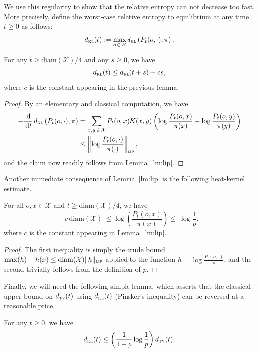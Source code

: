 \documentclass[AHL,Unicode,longabstracts,published]{cedram}
\newcommand{\dd}{\,\mathrm{d}}
\newcommand{\cX}{\mathcal{X}}
\newcommand{\dtv}{d_{\textsc{tv}}}
\newcommand{\dkl}{d_{\textsc{kl}}}
\newcommand{\pim}{p}
\newcommand{\diam}{\mathrm{diam}}
\newcommand{\lip}{{\textsc{lip}}}
\begin{document}
We use this regularity to show that the relative entropy can not decrease too fast. More precisely, define the worst-case relative entropy to equilibrium at any time $t\ge 0$ as follows:
\[
\dkl(t) := \max_{o\,\in\,\cX}\dkl\left(P_t(o,\cdot),\pi\right).
\]


\begin{lemm}\label{lm:slow}
For any $t\ge \diam(\cX)/4$ and any $s\ge 0$, we have
\[
\dkl(t) \le \dkl(t+s)+c s,
\]
where $c$ is the constant appearing in the previous lemma.
\end{lemm}

\begin{proof}
By an elementary and classical computation, we have
\begin{align*}
-\frac{\dd}{\dd t}\,\dkl\left(P_t(o,\cdot),\pi\right) & = \sum_{x,y\,\in\,\cX}P_t(o,x)K(x,y)\left(\log\frac{P_t(o,x)}{\pi(x)}-\log\frac{P_t(o,y)}{\pi(y)}\right)\\
& \le \left\|\log \frac{P_t(o,\cdot)}{\pi(\cdot)}\right\|_{\textsc{lip}},
\end{align*}
and the claim now readily follows from Lemma~\ref{lm:lip}.
\end{proof}

Another immediate consequence of Lemma~\ref{lm:lip} is the following heat-kernel estimate.

\begin{lemm}\label{lm:uniform}
For all $o,x\in\cX$ and $t\ge \diam(\cX)/4$, we have
\[
-c\,\diam(\cX) \ \le \log\left(\frac{P_t(o,x)}{\pi(x)}\right) \le \ \log\frac{1}{p},
\]
where $c$ is the constant appearing in Lemma~\ref{lm:lip}.
\end{lemm}


\begin{proof}
The first inequality is simply the crude bound $\max(h)-h(x)\le
\diam(\cX)\linebreak\|h\|_\lip$ applied to the function $h=\log
\frac{P_t(o,\cdot)}{\pi}$, and the second trivially follows from the definition of $p$.
\end{proof}

Finally, we will need the following simple lemma, which asserts that the classical upper bound on $\dtv(t)$ using $\dkl(t)$ (Pinsker's inequality) can be reversed at a reasonable price.

\begin{lemm}\label{lm:pinsker}
For any $t\ge 0$, we have
\[
\dkl(t) \le \left(\frac{1}{1-\pim}\log\frac 1{\pim}\right)\dtv(t).
\]
\end{lemm}
\end{document}
